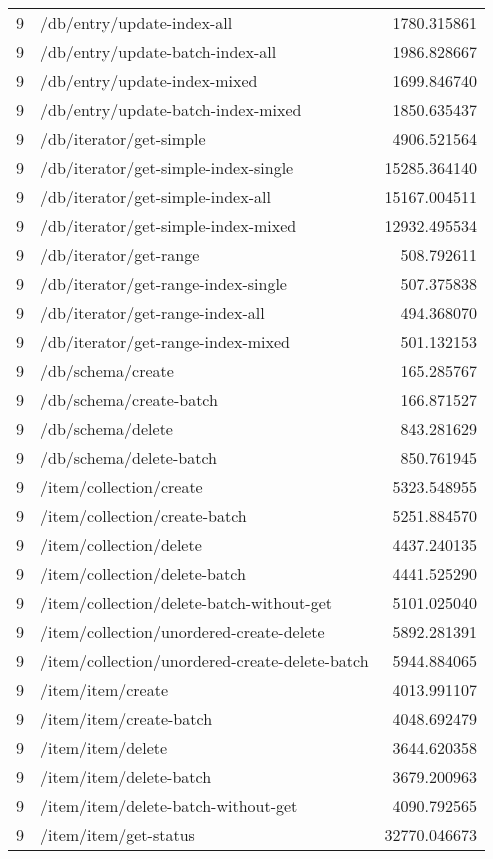 \begin{longtable}{rlr}
9 & /db/entry/update-index-all & 1780.315861 \\
9 & /db/entry/update-batch-index-all & 1986.828667 \\
9 & /db/entry/update-index-mixed & 1699.846740 \\
9 & /db/entry/update-batch-index-mixed & 1850.635437 \\
9 & /db/iterator/get-simple & 4906.521564 \\
9 & /db/iterator/get-simple-index-single & 15285.364140 \\
9 & /db/iterator/get-simple-index-all & 15167.004511 \\
9 & /db/iterator/get-simple-index-mixed & 12932.495534 \\
9 & /db/iterator/get-range & 508.792611 \\
9 & /db/iterator/get-range-index-single & 507.375838 \\
9 & /db/iterator/get-range-index-all & 494.368070 \\
9 & /db/iterator/get-range-index-mixed & 501.132153 \\
9 & /db/schema/create & 165.285767 \\
9 & /db/schema/create-batch & 166.871527 \\
9 & /db/schema/delete & 843.281629 \\
9 & /db/schema/delete-batch & 850.761945 \\
9 & /item/collection/create & 5323.548955 \\
9 & /item/collection/create-batch & 5251.884570 \\
9 & /item/collection/delete & 4437.240135 \\
9 & /item/collection/delete-batch & 4441.525290 \\
9 & /item/collection/delete-batch-without-get & 5101.025040 \\
9 & /item/collection/unordered-create-delete & 5892.281391 \\
9 & /item/collection/unordered-create-delete-batch & 5944.884065 \\
9 & /item/item/create & 4013.991107 \\
9 & /item/item/create-batch & 4048.692479 \\
9 & /item/item/delete & 3644.620358 \\
9 & /item/item/delete-batch & 3679.200963 \\
9 & /item/item/delete-batch-without-get & 4090.792565 \\
9 & /item/item/get-status & 32770.046673 \\

\end{longtable}
